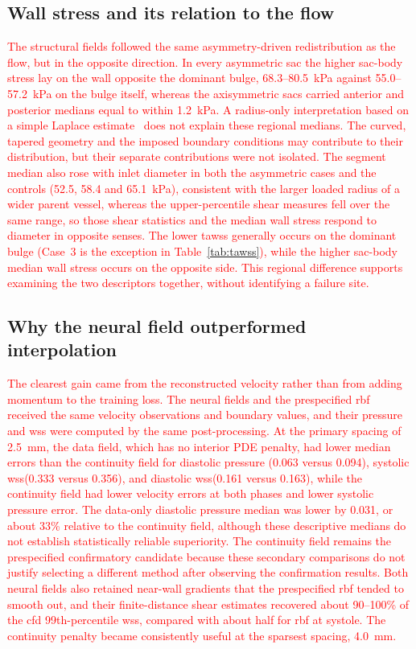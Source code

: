 \documentclass[12pt,a4paper]{article}
\newcommand{\CFD}{\ac{cfd}\xspace}
\newcommand{\WSS}{\ac{wss}\xspace}
\newcommand{\TAWSS}{\ac{tawss}\xspace}
\newcommand{\RBF}{\ac{rbf}\xspace}
\theoremstyle{definition}
\numberwithin{equation}{section}
\newcommand{\revision}[1]{\textcolor{red}{#1}}
\begin{document}
\subsection{Wall stress and its relation to the flow}
\revision{The structural fields followed the same asymmetry-driven redistribution as the flow, but in the opposite direction. In every asymmetric sac the higher sac-body stress lay on the wall opposite the dominant bulge, 68.3--80.5~kPa against 55.0--57.2~kPa on the bulge itself, whereas the axisymmetric sacs carried anterior and posterior medians equal to within 1.2~kPa. A radius-only interpretation based on a simple Laplace estimate~\cite{dobrin1989pathophysiology} does not explain these regional medians. The curved, tapered geometry and the imposed boundary conditions may contribute to their distribution, but their separate contributions were not isolated. The segment median also rose with inlet diameter in both the asymmetric cases and the controls (52.5, 58.4 and 65.1~kPa), consistent with the larger loaded radius of a wider parent vessel, whereas the upper-percentile shear measures fell over the same range, so those shear statistics and the median wall stress respond to diameter in opposite senses. The lower \TAWSS generally occurs on the dominant bulge (Case~3 is the exception in Table~\ref{tab:tawss}), while the higher sac-body median wall stress occurs on the opposite side. This regional difference supports examining the two descriptors together, without identifying a failure site.}

\subsection{Why the neural field outperformed interpolation}
\revision{The clearest gain came from the reconstructed velocity rather than from adding momentum to the training loss. The neural fields and the prespecified \RBF received the same velocity observations and boundary values, and their pressure and \WSS were computed by the same post-processing. At the primary spacing of 2.5~mm, the data field, which has no interior PDE penalty, had lower median errors than the continuity field for diastolic pressure (0.063 versus 0.094), systolic \WSS (0.333 versus 0.356), and diastolic \WSS (0.161 versus 0.163), while the continuity field had lower velocity errors at both phases and lower systolic pressure error. The data-only diastolic pressure median was lower by 0.031, or about 33\% relative to the continuity field, although these descriptive medians do not establish statistically reliable superiority. The continuity field remains the prespecified confirmatory candidate because these secondary comparisons do not justify selecting a different method after observing the confirmation results. Both neural fields also retained near-wall gradients that the prespecified \RBF tended to smooth out, and their finite-distance shear estimates recovered about 90--100\% of the \CFD 99th-percentile \WSS, compared with about half for \RBF at systole. The continuity penalty became consistently useful at the sparsest spacing, 4.0~mm.}
\end{document}
